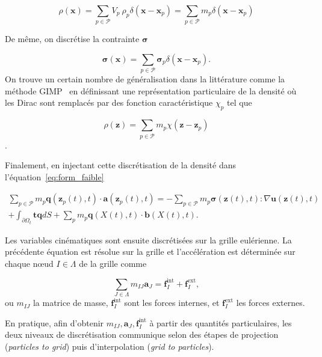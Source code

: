 \begin{equation*}
    \rho(\bm x) = \sum_{p \in \mathcal P} V_p~\rho_p \delta(\bm x - \bm x_p) = \sum_{p \in \mathcal P} m_p \delta(\bm x - \bm x_p)
\end{equation*}

De même, on discrétise la contrainte $\bm \sigma$

\begin{equation*}
    \bm \sigma(\bm x) = \sum_{p \in \mathcal P} \bm \sigma_p \delta(\bm x - \bm x_p).
\end{equation*}
On trouve un certain nombre de généralisation dans la littérature comme la méthode GIMP~\cite{bardenhagen_generalized_2004} en définissant une représentation particulaire de la densité où les Dirac sont remplacés par des fonction caractéristique $\chi_p$ tel que

\begin{equation*}
    \rho(\bm z) = \sum_{p \in \mathcal P} m_p \chi(\bm z - \bm z_p)
\end{equation*}.

Finalement, en injectant cette discrétisation de la densité dans l'équation~\eqref{eq:form_faible}

\begin{multline*}
    \sum_{p \in \mathcal P} m_p \bm q(\bm z_p(t), t)\cdot \bm a(\bm z_p(t), t) = - \sum_{p \in \mathcal P} m_p \bm \sigma(\bm z(t), t) : \nabla \bm u(\bm z(t), t) \\
    + \int_{\partial \Omega_t} \bm t \bm q dS + \sum_{p} m_p \bm q(X(t), t) \cdot \bm b(X(t), t).
\end{multline*}

Les variables cinématiques sont ensuite discrétisées sur la grille eulérienne. La précédente équation est résolue sur la grille et l'accélération est déterminée sur chaque nœud $I \in \Lambda$ de la grille comme

\begin{equation*}\label{eq:mpm_pfd}
    \sum_{J \in \Lambda} m_{IJ} \bm a_J = \bm f_I^{\text{int}} + \bm f_I^{\text{ext}},
\end{equation*}ou $m_{IJ}$ la matrice de masse, $\bm f_I^{\text{int}}$ sont les forces internes, et $\bm f_I^{\text{ext}}$ les forces externes.

En pratique, afin d'obtenir $m_{IJ},\bm a_J,\bm f_I^{\text{int}}$ à partir des quantités particulaires, les deux niveaux de discrétisation communique selon des étapes de projection (\textit{particles to grid}) puis d'interpolation (\textit{grid to particles}).

